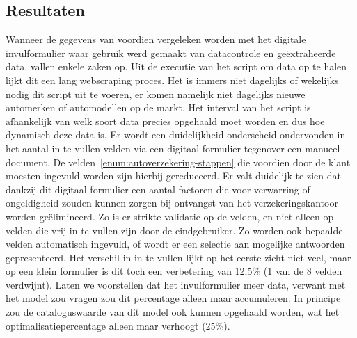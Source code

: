 \subsection{Resultaten}
Wanneer de gegevens van voordien vergeleken worden met het digitale invulformulier waar gebruik werd gemaakt van datacontrole en geëxtraheerde data, vallen enkele zaken op. Uit de executie van het script om data op te halen lijkt dit een lang webscraping proces. Het is immers niet dagelijks of wekelijks nodig dit script uit te voeren, er komen namelijk niet dagelijks nieuwe automerken of automodellen op de markt. Het interval van het script is afhankelijk van welk soort data precies opgehaald moet worden en dus hoe dynamisch deze data is.
Er wordt een duidelijkheid onderscheid ondervonden in het aantal in te vullen velden via een digitaal formulier tegenover een manueel document. De velden~\ref{enum:autoverzekering-stappen} die voordien door de klant moesten ingevuld worden zijn hierbij gereduceerd.
Er valt duidelijk te zien dat dankzij dit digitaal formulier een aantal factoren die voor verwarring of ongeldigheid zouden kunnen zorgen bij ontvangst van het verzekeringskantoor worden geëlimineerd.
Zo is er strikte validatie op de velden, en niet alleen op velden die vrij in te vullen zijn door de eindgebruiker.
Zo worden ook bepaalde velden automatisch ingevuld, of wordt er een selectie aan mogelijke antwoorden gepresenteerd.
Het verschil in in te vullen lijkt op het eerste zicht niet veel, maar op een klein formulier is dit toch een verbetering van 12,5\% (1 van de 8 velden verdwijnt). Laten we voorstellen dat het invulformulier meer data, verwant met het model zou vragen zou dit percentage alleen maar accumuleren.
In principe zou de cataloguswaarde van dit model ook kunnen opgehaald worden, wat het optimalisatiepercentage alleen maar verhoogt (25\%).
